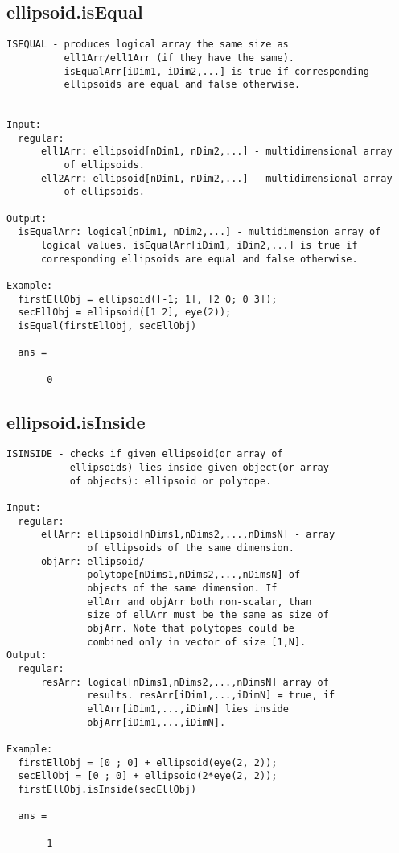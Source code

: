 \subsection{\texorpdfstring{ellipsoid.isEqual}{isEqual}}\label{method:ellipsoid.isEqual}
\begin{verbatim}
ISEQUAL - produces logical array the same size as
          ell1Arr/ell1Arr (if they have the same).
          isEqualArr[iDim1, iDim2,...] is true if corresponding
          ellipsoids are equal and false otherwise.


Input:
  regular:
      ell1Arr: ellipsoid[nDim1, nDim2,...] - multidimensional array
          of ellipsoids.
      ell2Arr: ellipsoid[nDim1, nDim2,...] - multidimensional array
          of ellipsoids.

Output:
  isEqualArr: logical[nDim1, nDim2,...] - multidimension array of
      logical values. isEqualArr[iDim1, iDim2,...] is true if
      corresponding ellipsoids are equal and false otherwise.

Example:
  firstEllObj = ellipsoid([-1; 1], [2 0; 0 3]);
  secEllObj = ellipsoid([1 2], eye(2));
  isEqual(firstEllObj, secEllObj)

  ans =

       0
\end{verbatim}
\subsection{\texorpdfstring{ellipsoid.isInside}{isInside}}\label{method:ellipsoid.isInside}
\begin{verbatim}
ISINSIDE - checks if given ellipsoid(or array of
           ellipsoids) lies inside given object(or array
           of objects): ellipsoid or polytope.

Input:
  regular:
      ellArr: ellipsoid[nDims1,nDims2,...,nDimsN] - array
              of ellipsoids of the same dimension.
      objArr: ellipsoid/
              polytope[nDims1,nDims2,...,nDimsN] of
              objects of the same dimension. If
              ellArr and objArr both non-scalar, than
              size of ellArr must be the same as size of
              objArr. Note that polytopes could be
              combined only in vector of size [1,N].
Output:
  regular:
      resArr: logical[nDims1,nDims2,...,nDimsN] array of
              results. resArr[iDim1,...,iDimN] = true, if
              ellArr[iDim1,...,iDimN] lies inside
              objArr[iDim1,...,iDimN].

Example:
  firstEllObj = [0 ; 0] + ellipsoid(eye(2, 2));
  secEllObj = [0 ; 0] + ellipsoid(2*eye(2, 2));
  firstEllObj.isInside(secEllObj)

  ans =

       1
\end{verbatim}
